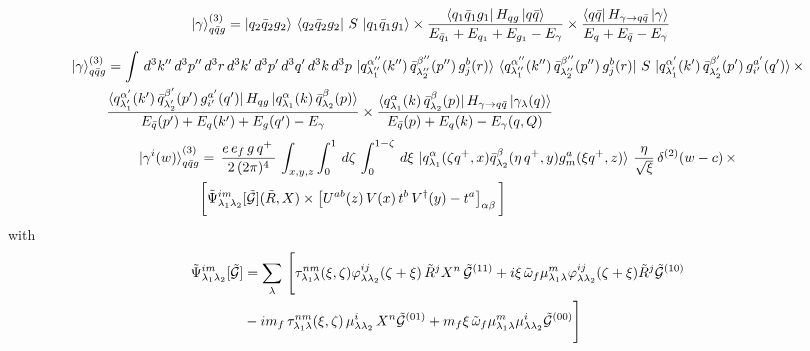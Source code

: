 \documentclass[9pt]{article}
\numberwithin{equation}{section}
\begin{document}
\begin{enumerate}
\begin{itemize}
\end{itemize}
\begin{align}
    \ket{\gamma}^{(3)}_{q\Bar{q}g} & = \ket{q_{2}\Bar{q}_{2}g_{2}}\,\bra{q_{2}\Bar{q}_{2}g_{2}}\,S\,\ket{q_{1}\Bar{q}_{1}g_{1}}\times \frac{\bra{q_{1}\Bar{q}_{1}g_{1}}H_{qg}\ket{q\Bar{q}}}{E_{\Bar{q}_{1}}+E_{q_{1}}+E_{g_{1}}-E_{\gamma}} \times \frac{\bra{q\Bar{q}}H_{\gamma\rightarrow q\Bar{q}}\ket{\gamma}}{E_{q}+E_{\Bar{q}}-E_{\gamma}}
\end{align}
\begin{align}
    \ket{\gamma}^{(3)}_{q\Bar{q}g} & = \int\, d^{3}k''\, d^{3}p''\, d^{3}r\,d^{3}k'\, d^{3}p'\, d^{3}q'\, d^{3}k\, d^{3}p\, \ket{q^{\alpha''}_{\lambda''_{1}}(k'')\,\Bar{q}^{\beta''}_{\lambda''_{2}}(p'')\,g^{b}_{j}(r)}\,\bra{q^{\alpha''}_{\lambda''_{1}}(k'')\,\Bar{q}^{\beta''}_{\lambda''_{2}}(p'')\,g^{b}_{j}(r)}\,S\,\ket{q^{\alpha'}_{\lambda'_{1}}(k')\,\Bar{q}^{\beta'}_{\lambda'_{2}}(p')\,g^{a'}_{i'}(q')}\times\notag \\ & \frac{\bra{q^{\alpha'}_{\lambda'_{1}}(k')\,\Bar{q}^{\beta'}_{\lambda'_{2}}(p')\,g^{a'}_{i'}(q')}H_{qg}\ket{q^{\alpha}_{\lambda_{1}}(k)\,\Bar{q}^{\beta}_{\lambda_{2}}(p)}}{E_{\Bar{q}}(p')+E_{q}(k')+E_{g}(q')-E_{\gamma}} \times \frac{\bra{q^{\alpha}_{\lambda_{1}}(k)\,\Bar{q}^{\beta}_{\lambda_{2}}(p)}H_{\gamma\rightarrow q\Bar{q}}\ket{\gamma_{\lambda}(q)}}{E_{\Bar{q}}(p)+E_{q}(k)-E_{\gamma}(q,Q)}
\end{align} 
\begin{align} \label{eq:5}
     \ket{\gamma^{i}(w)}^{(3)}_{q\Bar{q}g} & = \,\frac{e\,e_{f}\,g\,q^{+}\,}{2\,(2\pi)^{4}}\, \int_{x,y,z} \int_{0}^{1}\, d\zeta\, \int_{0}^{1-\zeta}\, d\xi\,\ket{q^{\alpha}_{\lambda_{1}}(\zeta q^{+},x)\Bar{q}^{\beta}_{\lambda_{2}}(\eta\,q^{+},y)g^{a}_{m}(\xi q^{+},z)}\, \frac{\eta}{\sqrt{\xi}}\, \delta^{(2)}(w-c)\,\times \notag \\ & \bigg[\Tilde{\Psi}^{im}_{\lambda_{1}\lambda_{2}}[\mathcal{\Tilde{G}}](\Tilde{R},X)\times \left[U^{ab}(z)\,V(x)\,t^{b}\,V^{\dagger}(y)-t^{a}\right]_{\alpha\beta}\bigg]
\end{align}
with 
\begin{align}
    \Tilde{\Psi}^{im}_{\lambda_{1}\lambda_{2}}[\mathcal{\Tilde{G}}] & = \sum_{\lambda}\, \Bigg[\tau^{nm}_{\lambda_{1}\lambda}(\xi,\zeta)\varphi^{ij}_{\lambda\lambda_{2}}(\zeta + \xi)\,\Tilde{R}^{j}X^{n}\,\mathcal{\Tilde{G}}^{(11)}+i\xi\,\Tilde{\omega}_{f}\mu^{m}_{\lambda_{1}\lambda}\varphi^{ij}_{\lambda\lambda_{2}}(\zeta + \xi)\Tilde{R}^{j}\mathcal{\Tilde{G}}^{(10)}\notag \\ & -im_{f}\,\tau^{nm}_{\lambda_{1}\lambda}(\xi,\zeta)\,\mu^{i}_{\lambda\lambda_{2}}\,X^{n}\mathcal{\Tilde{G}}^{(01)} + m_{f}\xi\,\Tilde{\omega}_{f}\mu^{m}_{\lambda_{1}\lambda}\mu^{i}_{\lambda\lambda_{2}}\mathcal{\Tilde{G}}^{(00)}\Bigg]

\end{align}
\end{enumerate}
\end{document}

